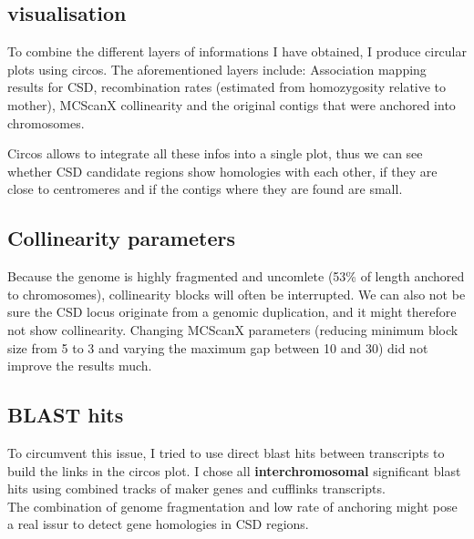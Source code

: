 \documentclass[10pt,a4paper]{report}
\begin{document}
\subsection{visualisation}
To combine the different layers of informations I have obtained, I produce circular plots using circos. The aforementioned layers include: Association mapping results for CSD, recombination rates (estimated from homozygosity relative to mother), MCScanX collinearity and the original contigs that were anchored into chromosomes. 

Circos allows to integrate all these infos into a single plot, thus we can see whether CSD candidate regions show homologies with each other, if they are close to centromeres and if the contigs where they are found are small.\\

\subsection{Collinearity parameters}
Because the genome is highly fragmented and uncomlete (53\% of length anchored to chromosomes), collinearity blocks will often be interrupted. We can also not be sure the CSD locus originate from a genomic duplication, and it might therefore not show collinearity. Changing MCScanX parameters (reducing minimum block size from 5 to 3 and varying the maximum gap between 10 and 30) did not improve the results much.

\subsection{BLAST hits}
To circumvent this issue, I tried to use direct blast hits between transcripts to build the links in the circos plot. I chose all \textbf{interchromosomal} significant blast hits using combined tracks of maker genes and cufflinks transcripts.\\

The combination of genome fragmentation and low rate of anchoring might pose a real issur to detect gene homologies in CSD regions.
\end{document}
